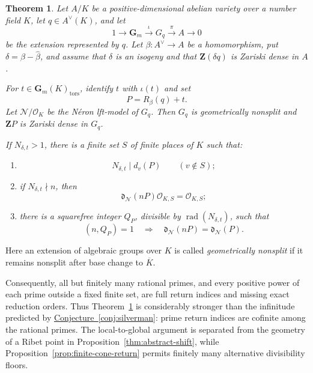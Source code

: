 \documentclass[11pt,letterpaper,reqno]{amsart}
\newtheorem{theorem}{Theorem}[section]
\theoremstyle{definition}
\theoremstyle{remark}
\newcommand{\Gm}{\mathbf G_m}
\newcommand{\Z}{\mathbf Z}
\newcommand{\OK}{\mathcal O_K}
\newcommand{\rad}{\operatorname{rad}}
\newcommand{\tors}{\mathrm{tors}}
\newcommand{\Ner}{\mathcal N}
\newcommand{\SilvermanConj}{\hyperref[conj:silverman]{Conjecture~\ref*{conj:silverman}}}
\begin{document}
\begin{theorem}
\label{thm:intro-main}
Let $A/K$ be a positive-dimensional abelian variety over a number field $K$,
let $q\in A^\vee(K)$, and let
\[
 1\longrightarrow\Gm\xrightarrow{\iota}G_q\xrightarrow{\pi}A
 \longrightarrow0
\]
be the extension represented by $q$.  Let $\beta:A^\vee\to A$ be a
homomorphism, put $\delta=\beta-\widehat\beta$, and assume that $\delta$ is an
isogeny and that $\Z(\delta q)$ is Zariski dense in $A$.

For $t\in\Gm(K)_{\tors}$, identify $t$ with $\iota(t)$ and set
\[
 P=R_\beta(q)+t.
\]
Let $\Ner/\OK$ be the N\'eron lft-model of $G_q$.  Then $G_q$ is
geometrically nonsplit and $\Z P$ is Zariski dense in $G_q$.

If $N_{\delta,t}>1$, there is a finite set $S$ of finite places of $K$ such
that:
\begin{enumerate}[label=\textup{(\roman*)}]
\item
\[
 N_{\delta,t}\mid d_v(P)\qquad(v\notin S);
\]
\item if $N_{\delta,t}\nmid n$, then
\[
 \mathfrak d_{\Ner}(nP)\mathcal O_{K,S}=\mathcal O_{K,S};
\]
\item there is a squarefree integer $Q_P$, divisible by
$\rad(N_{\delta,t})$, such that
\[
 (n,Q_P)=1
 \quad\Longrightarrow\quad
 \mathfrak d_{\Ner}(nP)=\mathfrak d_{\Ner}(P).
\]
\end{enumerate}
\end{theorem}

Here an extension of algebraic groups over $K$ is called
\emph{geometrically nonsplit} if it remains nonsplit after base change to
$\overline K$.

Consequently, all but finitely many rational primes, and every positive power
of each prime outside a fixed finite set, are full return indices and missing
exact reduction orders.  Thus Theorem~\ref{thm:intro-main} is considerably
stronger than the infinitude predicted by \SilvermanConj{}: prime return
indices are cofinite among the rational primes.  The local-to-global argument
is separated from the geometry of a Ribet point in
Proposition~\ref{thm:abstract-shift}, while
Proposition~\ref{prop:finite-cone-return} permits finitely many alternative
divisibility floors.
\end{document}
